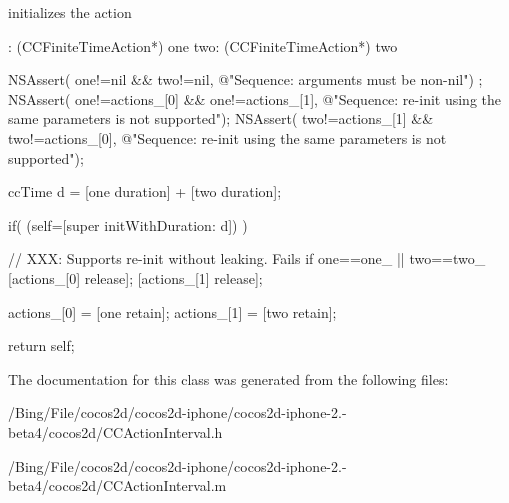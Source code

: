 initializes the action 
\begin{DoxyCode}
             : (CCFiniteTimeAction*) one two: (CCFiniteTimeAction*) two
{
        NSAssert( one!=nil && two!=nil, @"Sequence: arguments must be non-nil")
      ;
        NSAssert( one!=actions_[0] && one!=actions_[1], @"Sequence: re-init
       using the same parameters is not supported");
        NSAssert( two!=actions_[1] && two!=actions_[0], @"Sequence: re-init
       using the same parameters is not supported");
        
        ccTime d = [one duration] + [two duration];
        
        if( (self=[super initWithDuration: d]) ) {
                
                // XXX: Supports re-init without leaking. Fails if one==one_ ||
       two==two_
                [actions_[0] release];
                [actions_[1] release];
                
                actions_[0] = [one retain];
                actions_[1] = [two retain];
        }
        
        return self;
}
\end{DoxyCode}


The documentation for this class was generated from the following files\-:\begin{DoxyCompactItemize}
\item 
/\-Bing/\-File/cocos2d/cocos2d-\/iphone/cocos2d-\/iphone-\/2.-\/beta4/cocos2d/C\-C\-Action\-Interval.\-h\item 
/\-Bing/\-File/cocos2d/cocos2d-\/iphone/cocos2d-\/iphone-\/2.-\/beta4/cocos2d/C\-C\-Action\-Interval.\-m\end{DoxyCompactItemize}
